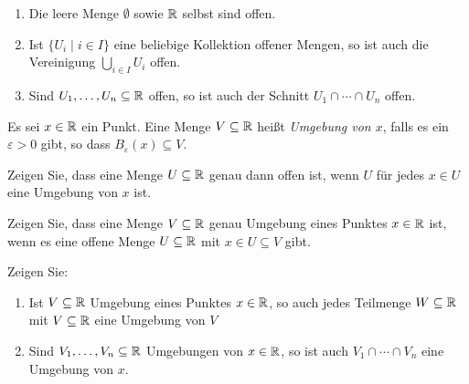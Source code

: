\documentclass[a4paper,10pt]{article}
\begin{document}
\begin{lem}
 \begin{enumerate}
  \item
   Die leere Menge $\emptyset$ sowie $\mathbb{R}$ selbst sind offen.
  \item
   Ist $\{U_i \mid i \in I\}$ eine beliebige Kollektion offener Mengen, so ist auch die Vereinigung $\bigcup_{i \in I} U_i$ offen.
  \item
   Sind $U_1, \dotsc, U_n \subseteq \mathbb{R}$ offen, so ist auch der Schnitt $U_1 \cap \dotsb \cap U_n$ offen.
 \end{enumerate}
\end{lem}


\begin{defi}
 Es sei $x \in \mathbb{R}$ ein Punkt. Eine Menge $V \subseteq \mathbb{R}$ heißt \emph{Umgebung von $x$}, falls es ein $\varepsilon > 0$ gibt, so dass $B_\varepsilon(x) \subseteq V$.
\end{defi}


\begin{question}
 Zeigen Sie, dass eine Menge $U \subseteq \mathbb{R}$ genau dann offen ist, wenn $U$ für jedes $x \in U$ eine Umgebung von $x$ ist.
\end{question}


\begin{question}
 Zeigen Sie, dass eine Menge $V \subseteq \mathbb{R}$ genau Umgebung eines Punktes $x \in \mathbb{R}$ ist, wenn es eine offene Menge $U \subseteq \mathbb{R}$ mit $x \in U \subseteq V$ gibt.
\end{question}


\begin{question}
 Zeigen Sie: 
 \begin{enumerate}
  \item
   Ist $V \subseteq \mathbb{R}$ Umgebung eines Punktes $x \in \mathbb{R}$, so auch jedes Teilmenge $W \subseteq \mathbb{R}$ mit $V \subseteq \mathbb{R}$ eine Umgebung von $V$
  \item
   Sind $V_1, \dotsc, V_n \subseteq \mathbb{R}$ Umgebungen von $x \in \mathbb{R}$, so ist auch $V_1 \cap \dotsb \cap V_n$ eine Umgebung von $x$.
 \end{enumerate}
\end{question}
\end{document}
